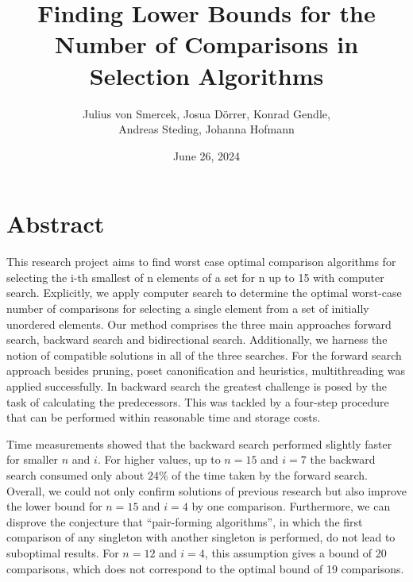 \documentclass[12pt]{article}
\begin{document}
\title{Finding Lower Bounds for the Number of Comparisons in Selection Algorithms}
\author{Julius von Smercek, Josua Dörrer, Konrad Gendle, \\ Andreas Steding, Johanna Hofmann}
\date{June 26, 2024}
\maketitle

\section*{Abstract}
This research project aims to find worst case optimal comparison algorithms for selecting the i-th smallest of n elements of
a set for n up to 15 with computer search.
Explicitly, we apply computer search to determine the optimal worst-case number of comparisons for selecting a single element from a set of initially unordered elements.
Our method comprises the three main approaches forward search, backward search and bidirectional search. 
Additionally, we harness the notion of compatible solutions in all of the three searches.
For the forward search approach besides pruning, poset canonification and heuristics, multithreading was applied successfully.
In backward search the greatest challenge is posed by the task of calculating the predecessors. 
This was tackled by a four-step procedure that can be performed within reasonable time and storage costs.

Time measurements showed that the backward search performed slightly faster for  smaller $n$ and $i$. For higher values, up to $n=15$ and $i=7$ the backward search consumed only about $24\%$ of the time taken by the forward search.
Overall, we could not only confirm solutions of previous research but also improve the lower bound for $n=15$ and $i=4$ by one comparison.
Furthermore, we can disprove the conjecture that “pair-forming algorithms”, in which the first comparison of any singleton with another singleton is performed, do not lead to suboptimal results. 
For $n = 12$ and $i = 4$, this assumption
gives a bound of 20 comparisons, which does not correspond
to the optimal bound of 19 comparisons.
\end{document}
